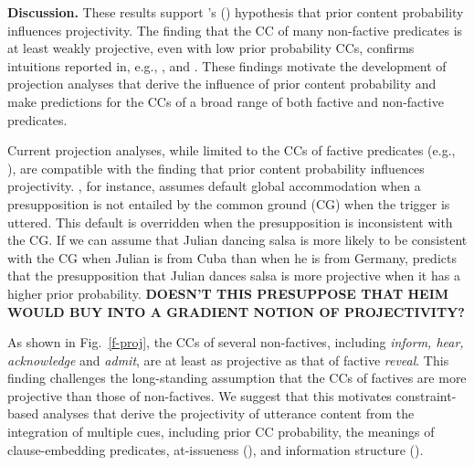 \documentclass[12pt,fleqn]{article}
\newcommand{\citetpos}[1]{\citeauthor{#1}'s (\citeyear{#1})}
\newcommand{\6}{\mbox{$[\hspace*{-.6mm}[$}}
\newcommand{\9}{\mbox{$]\hspace*{-.6mm}]$}}
\begin{document}
\noindent
{\bf Discussion.}
These results support \citetpos{tbd-variability} hypothesis that prior content probability influences projectivity. The finding that the CC of many non-factive predicates is at least weakly projective, even with low prior probability CCs, confirms intuitions reported in, e.g., \citealt{schlenker10}, \citealt{anand-hacquard2014} and \citealt{spector-egre2015}. These findings motivate the development of projection analyses that derive the influence of prior content probability and make predictions for the CCs of a broad range of both factive and non-factive predicates.

Current projection analyses, while limited to the CCs of factive predicates (e.g., \citealt{heim83,vds92,abrusan2011,brst-salt10,brst-ar}), are compatible with the finding that prior content probability influences projectivity. \citealt{heim83}, for instance, assumes default global accommodation when a presupposition is not entailed by the common ground (CG) when the trigger is uttered. This default is overridden when the presupposition is inconsistent with the CG. If we can assume that Julian dancing salsa is more likely to be consistent with the CG when Julian is from Cuba than when he is from Germany, \citealt{heim83} predicts that the presupposition that Julian dances salsa is more projective when it has a higher prior probability. \textbf{DOESN'T THIS PRESUPPOSE THAT HEIM WOULD BUY INTO A GRADIENT NOTION OF PROJECTIVITY?} 

As shown in Fig.~\ref{f-proj}, the CCs of several non-factives, including {\em inform, hear, acknowledge} and {\em admit}, are at least as projective as that of factive {\em reveal}. This finding challenges the long-standing assumption that the CCs of factives are more projective than those of non-factives. We suggest that this motivates constraint-based analyses that derive the projectivity of utterance content from the integration of multiple cues, including prior CC probability, the meanings of clause-embedding predicates, at-issueness (\citealt{tbd-variability}), and information structure (\citealt{tonhauser-salt26}).

\newpage


\end{document}
